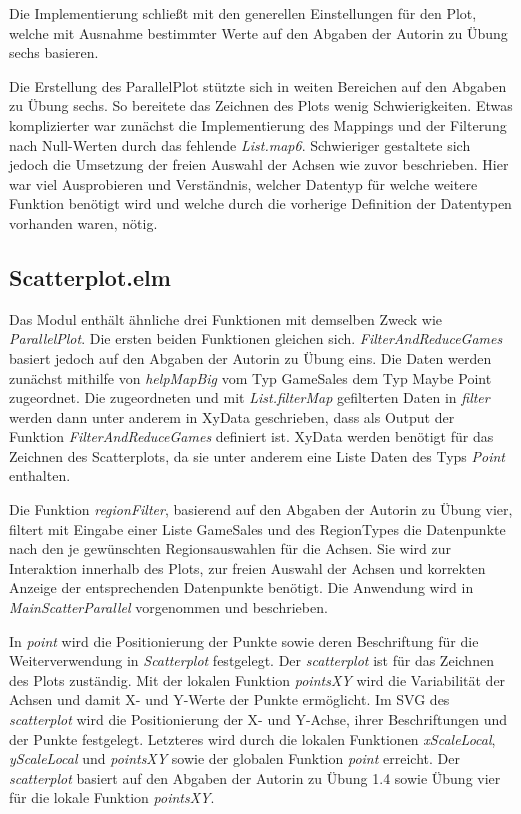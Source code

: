 \documentclass[usegeometry=true]{scrartcl}
\begin{document}
Die Implementierung schließt mit den generellen Einstellungen für den Plot, welche mit Ausnahme bestimmter Werte auf den Abgaben der Autorin zu Übung sechs basieren. 

Die Erstellung des ParallelPlot stützte sich in weiten Bereichen auf den Abgaben zu Übung sechs. 
So bereitete das Zeichnen des Plots wenig Schwierigkeiten. 
Etwas komplizierter war zunächst die Implementierung des Mappings und der Filterung nach Null-Werten durch das fehlende \textit{List.map6}. 
Schwieriger gestaltete sich jedoch die Umsetzung der freien Auswahl der Achsen wie zuvor beschrieben. 
Hier war viel Ausprobieren und Verständnis, welcher Datentyp für welche weitere Funktion benötigt wird und welche durch die vorherige Definition der Datentypen vorhanden waren, nötig.

\subsection{Scatterplot.elm}
Das Modul enthält ähnliche drei Funktionen mit demselben Zweck wie \textit{ParallelPlot}.
Die ersten beiden Funktionen gleichen sich.
\textit{FilterAndReduceGames} basiert jedoch auf den Abgaben der Autorin zu Übung eins.
Die Daten werden zunächst mithilfe von \textit{helpMapBig} vom Typ GameSales dem Typ Maybe Point zugeordnet. 
Die zugeordneten und mit \textit{List.filterMap} gefilterten Daten in \textit{filter} werden dann unter anderem in XyData geschrieben, dass als Output der Funktion \textit{FilterAndReduceGames} definiert ist.
XyData werden benötigt für das Zeichnen des Scatterplots, da sie unter anderem eine Liste Daten des Typs \textit{Point} enthalten.

Die Funktion \textit{regionFilter}, basierend auf den Abgaben der Autorin zu Übung vier, filtert mit Eingabe einer Liste GameSales und des RegionTypes die Datenpunkte nach den je gewünschten Regionsauswahlen für die Achsen. 
Sie wird zur Interaktion innerhalb des Plots, zur freien Auswahl der Achsen und korrekten Anzeige der entsprechenden Datenpunkte benötigt.
Die Anwendung wird in \textit{MainScatterParallel} vorgenommen und beschrieben.

In \textit{point} wird die Positionierung der Punkte sowie deren Beschriftung für die Weiterverwendung in \textit{Scatterplot} festgelegt.
Der \textit{scatterplot} ist für das Zeichnen des Plots zuständig. 
Mit der lokalen Funktion \textit{pointsXY} wird die Variabilität der Achsen und damit X- und Y-Werte der Punkte ermöglicht.
Im SVG des \textit{scatterplot} wird die Positionierung der X- und Y-Achse, ihrer Beschriftungen und der Punkte festgelegt. 
Letzteres wird durch die lokalen Funktionen \textit{xScaleLocal}, \textit{yScaleLocal} und \textit{pointsXY} sowie der globalen Funktion \textit{point} erreicht.
Der \textit{scatterplot} basiert auf den Abgaben der Autorin zu Übung 1.4 sowie Übung vier für die lokale Funktion \textit{pointsXY}. 
\end{document}
